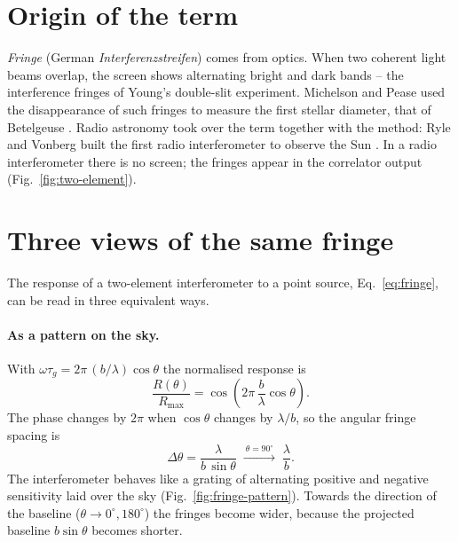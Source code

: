 
\section{Origin of the term}

\emph{Fringe} (German \emph{Interferenzstreifen}) comes from optics. When
two coherent light beams overlap, the screen shows alternating bright
and dark bands -- the interference fringes of Young's double-slit
experiment. Michelson and Pease used the disappearance of such fringes
to measure the first stellar diameter, that of Betelgeuse
\cite{michelson1921}. Radio astronomy took over the term together with
the method: Ryle and Vonberg built the first radio interferometer to
observe the Sun \cite{ryle1946}. In a radio interferometer there is no
screen; the fringes appear in the correlator output
(Fig.~\ref{fig:two-element}).

\section{Three views of the same fringe}

The response of a two-element interferometer to a point source,
Eq.~\eqref{eq:fringe}, can be read in three equivalent ways.

\paragraph*{As a pattern on the sky.} With $\omega\tau_g =
2\pi\,(b/\lambda)\cos\theta$ the normalised response is
\begin{equation}
  \frac{R(\theta)}{R_{\max}} = \cos\!\left(2\pi\,\frac{b}{\lambda}\cos\theta\right).
\end{equation}
The phase changes by $2\pi$ when $\cos\theta$ changes by $\lambda/b$, so
the angular fringe spacing is
\begin{equation}
  \Delta\theta = \frac{\lambda}{b\,\sin\theta}
  \;\xrightarrow{\ \theta=90^\circ\ }\; \frac{\lambda}{b} .
\end{equation}
The interferometer behaves like a grating of alternating positive and
negative sensitivity laid over the sky (Fig.~\ref{fig:fringe-pattern}).
Towards the direction of the baseline ($\theta\to0^\circ, 180^\circ$)
the fringes become wider, because the projected baseline
$b\sin\theta$ becomes shorter.

